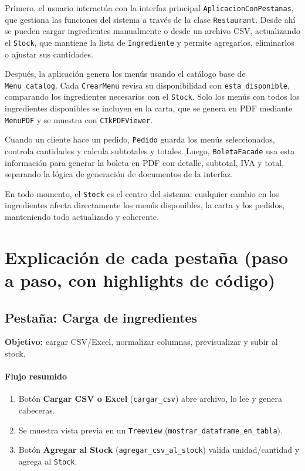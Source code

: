 \documentclass[12pt,a4paper]{article}
\begin{document}
Primero, el usuario interactúa con la interfaz principal \texttt{AplicacionConPestanas}, que gestiona las funciones del sistema a través de la clase \texttt{Restaurant}. Desde ahí se pueden cargar ingredientes manualmente o desde un archivo CSV, actualizando el \texttt{Stock}, que mantiene la lista de \texttt{Ingrediente} y permite agregarlos, eliminarlos o ajustar sus cantidades.

Después, la aplicación genera los menús usando el catálogo base de \texttt{Menu\_catalog}. Cada \texttt{CrearMenu} revisa su disponibilidad con \texttt{esta\_disponible}, comparando los ingredientes necesarios con el \texttt{Stock}. Solo los menús con todos los ingredientes disponibles se incluyen en la carta, que se genera en PDF mediante \texttt{MenuPDF} y se muestra con \texttt{CTkPDFViewer}.

Cuando un cliente hace un pedido, \texttt{Pedido} guarda los menús seleccionados, controla cantidades y calcula subtotales y totales. Luego, \texttt{BoletaFacade} usa esta información para generar la boleta en PDF con detalle, subtotal, IVA y total, separando la lógica de generación de documentos de la interfaz.

En todo momento, el \texttt{Stock} es el centro del sistema: cualquier cambio en los ingredientes afecta directamente los menús disponibles, la carta y los pedidos, manteniendo todo actualizado y coherente.


\newpage

\section{Explicación de cada pestaña (paso a paso, con highlights de código)}

\subsection{Pestaña: Carga de ingredientes}
\textbf{Objetivo:} cargar CSV/Excel, normalizar columnas, previsualizar y subir al stock.

\paragraph{Flujo resumido}
\begin{enumerate}[leftmargin=*]
  \item Botón \textbf{Cargar CSV o Excel} (\texttt{cargar\_csv}) abre archivo, lo lee y genera cabeceras.
  \item Se muestra vista previa en un \texttt{Treeview} (\texttt{mostrar\_dataframe\_en\_tabla}).
  \item Botón \textbf{Agregar al Stock} (\texttt{agregar\_csv\_al\_stock}) valida unidad/cantidad y agrega al \texttt{Stock}.
\end{enumerate}
\end{document}
